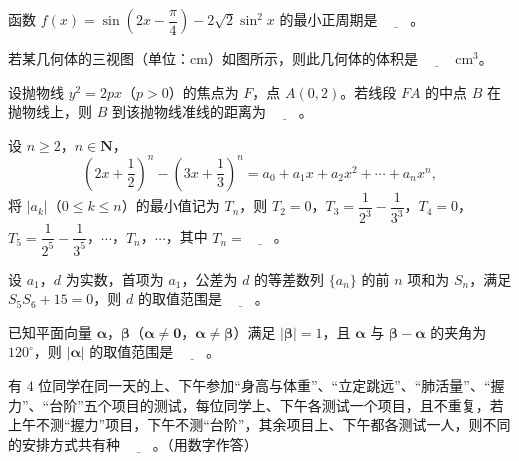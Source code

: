 \begin{question}
函数 $f(x)=\sin\left(2x-\dfrac{\pi}{4}\right)-2\sqrt2\sin^2x$ 的最小正周期是 $\underline{\qquad}$。

\Needspace{0.4\textheight}
\end{question}
\begingroup
\renewenvironment{question}{\Needspace{0.5\textheight}}{}
\begin{question}
若某几何体的三视图（单位：cm）如图所示，则此几何体的体积是 $\underline{\qquad}$ cm$^3$。
\nopagebreak[4]
\begin{center}\end{center}
\nopagebreak[4]
\end{question}
\endgroup
\begin{question}
设抛物线 $y^2=2px$（$p>0$）的焦点为 $F$，点 $A(0,2)$。若线段 $FA$ 的中点 $B$ 在抛物线上，则 $B$ 到该抛物线准线的距离为 $\underline{\qquad}$。

\end{question}
\begin{question}
设 $n\geqslant 2$，$n\in\mathbf N$，
\nopagebreak[4]
\[\left(2x+\frac12\right)^n-\left(3x+\frac13\right)^n=a_0+a_1x+a_2x^2+\cdots+a_nx^n,\]
将 $|a_k|$（$0\leqslant k\leqslant n$）的最小值记为 $T_n$，则 $T_2=0$，$T_3=\dfrac1{2^3}-\dfrac1{3^3}$，$T_4=0$，$T_5=\dfrac1{2^5}-\dfrac1{3^5}$，$\cdots$，$T_n$，$\cdots$，其中 $T_n=\underline{\qquad}$。

\end{question}
\begin{question}
设 $a_1$，$d$ 为实数，首项为 $a_1$，公差为 $d$ 的等差数列 $\{a_n\}$ 的前 $n$ 项和为 $S_n$，满足 $S_5S_6+15=0$，则 $d$ 的取值范围是 $\underline{\qquad}$。

\end{question}
\begin{question}
已知平面向量 $\boldsymbol\alpha$，$\boldsymbol\beta$（$\boldsymbol\alpha\neq\mathbf 0$，$\boldsymbol\alpha\neq\boldsymbol\beta$）满足 $|\boldsymbol\beta|=1$，且 $\boldsymbol\alpha$ 与 $\boldsymbol\beta-\boldsymbol\alpha$ 的夹角为 $120^\circ$，则 $|\boldsymbol\alpha|$ 的取值范围是 $\underline{\qquad}$。

\end{question}
\begin{question}
有 $4$ 位同学在同一天的上、下午参加“身高与体重”、“立定跳远”、“肺活量”、“握力”、“台阶”五个项目的测试，每位同学上、下午各测试一个项目，且不重复，若上午不测“握力”项目，下午不测“台阶”，其余项目上、下午都各测试一人，则不同的安排方式共有种 $\underline{\qquad}$。（用数字作答）

\end{question}
